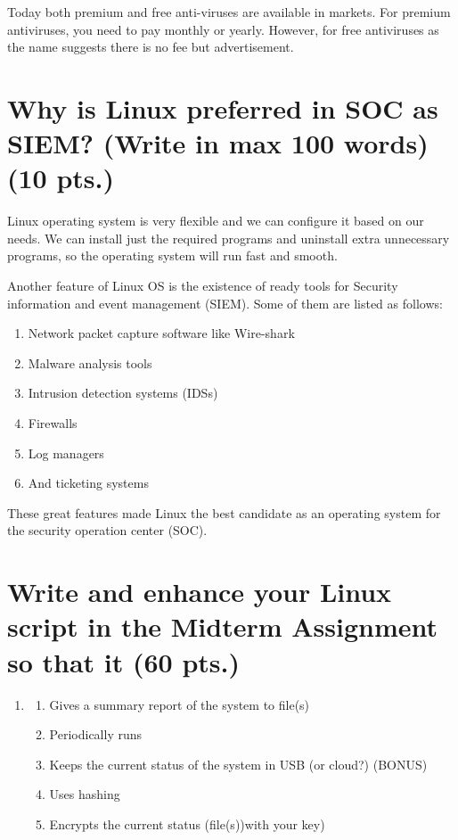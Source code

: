 \documentclass{article} %
\begin{document}
\noindent Today both premium and free anti-viruses are available in markets. For premium antiviruses, you need to pay monthly or yearly. However, for free antiviruses as the name suggests there is no fee but advertisement. 


\section{  Why is Linux preferred in SOC as SIEM? (Write in max 100 words) (10 pts.)}

\noindent Linux operating system is very flexible and we can configure it based on our needs. We can install just the required programs and uninstall extra unnecessary programs, so the operating system will run fast and smooth. 

\noindent Another feature of Linux OS is the existence of ready tools for Security information and event management (SIEM). Some of them are listed as follows:

\begin{enumerate}
\item  Network packet capture software like Wire-shark

\item  Malware analysis tools

\item  Intrusion detection systems (IDSs)

\item  Firewalls

\item  Log managers

\item  And ticketing systems
\end{enumerate}

\noindent These great features made Linux the best candidate as an operating system for the security operation center (SOC).


\section{ Write and enhance your Linux script in the Midterm Assignment so that it (60 pts.) }

\begin{enumerate}
\item \begin{enumerate}
\item  Gives a summary report of the system to file(s) 

\item  Periodically runs 

\item  Keeps the current status of the system in USB (or cloud?) (BONUS) 

\item  Uses hashing 

\item  Encrypts the current status (file(s))with your key)
\end{enumerate}
\end{enumerate}
\end{document}
